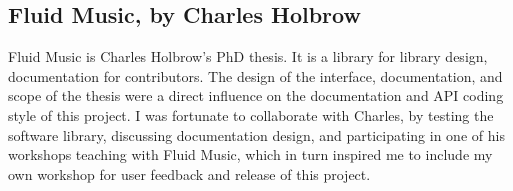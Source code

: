 \subsection{Fluid Music, by Charles Holbrow}

Fluid Music is Charles Holbrow's PhD thesis. It is a library for library design, documentation for contributors. The design of the interface, documentation, and scope of the thesis were a direct influence on the documentation and API coding style of this project. I was fortunate to collaborate with Charles, by testing the software library, discussing documentation design, and participating in one of his workshops teaching with Fluid Music, which in turn inspired me to include my own workshop for user feedback and release of this project.
